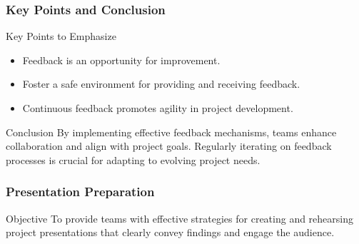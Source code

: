 \documentclass[aspectratio=169]{beamer}
\begin{document}
\begin{frame}[fragile]
    \frametitle{Key Points and Conclusion}
    \begin{block}{Key Points to Emphasize}
        \begin{itemize}
            \item Feedback is an opportunity for improvement.
            \item Foster a safe environment for providing and receiving feedback.
            \item Continuous feedback promotes agility in project development.
        \end{itemize}
    \end{block}

    \begin{block}{Conclusion}
        By implementing effective feedback mechanisms, teams enhance collaboration and align with project goals. Regularly iterating on feedback processes is crucial for adapting to evolving project needs.
    \end{block}
\end{frame}

\begin{frame}[fragile]
    \frametitle{Presentation Preparation}
    
    \begin{block}{Objective}
        To provide teams with effective strategies for creating and rehearsing project presentations that clearly convey findings and engage the audience.
    \end{block}
\end{frame}
\end{document}
